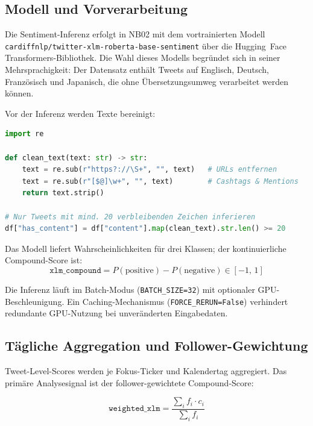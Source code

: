 \documentclass[11pt, a4paper]{article}
\begin{document}
\subsection{Modell und Vorverarbeitung}

Die Sentiment-Inferenz erfolgt in NB02 mit dem vortrainierten Modell
\texttt{cardiffnlp/twitter-xlm-roberta-base-sentiment}
\autocite{loureiro2022timelms} über die Hugging~Face
Transformers-Bibliothek. Die Wahl dieses Modells begründet sich in seiner
Mehrsprachigkeit: Der Datensatz enthält Tweets auf Englisch, Deutsch,
Französisch und Japanisch, die ohne Übersetzungsumweg verarbeitet werden können.

Vor der Inferenz werden Texte bereinigt:

\begin{lstlisting}[language=Python, caption={Textbereinigung vor Modell-Inferenz}]
import re

def clean_text(text: str) -> str:
    text = re.sub(r"https?://\S+", "", text)   # URLs entfernen
    text = re.sub(r"[$@]\w+", "", text)        # Cashtags & Mentions
    return text.strip()

# Nur Tweets mit mind. 20 verbleibenden Zeichen inferieren
df["has_content"] = df["content"].map(clean_text).str.len() >= 20
\end{lstlisting}

Das Modell liefert Wahrscheinlichkeiten für drei Klassen; der kontinuierliche
Compound-Score ist:
\begin{equation}
\texttt{xlm\_compound} = P(\text{positive}) - P(\text{negative}) \in [-1,\, 1]
\end{equation}

Die Inferenz läuft im Batch-Modus (\texttt{BATCH\_SIZE=32}) mit optionaler
GPU-Beschleunigung. Ein Caching-Mechanismus (\texttt{FORCE\_RERUN=False})
verhindert redundante GPU-Nutzung bei unveränderten Eingabedaten.

\subsection{Tägliche Aggregation und Follower-Gewichtung}

Tweet-Level-Scores werden je Fokus-Ticker und Kalendertag aggregiert.
Das primäre Analysesignal ist der follower-gewichtete Compound-Score:

\begin{equation}
\texttt{weighted\_xlm} = \frac{\sum_{i} f_i \cdot c_i}{\sum_{i} f_i}
\end{equation}
\end{document}

